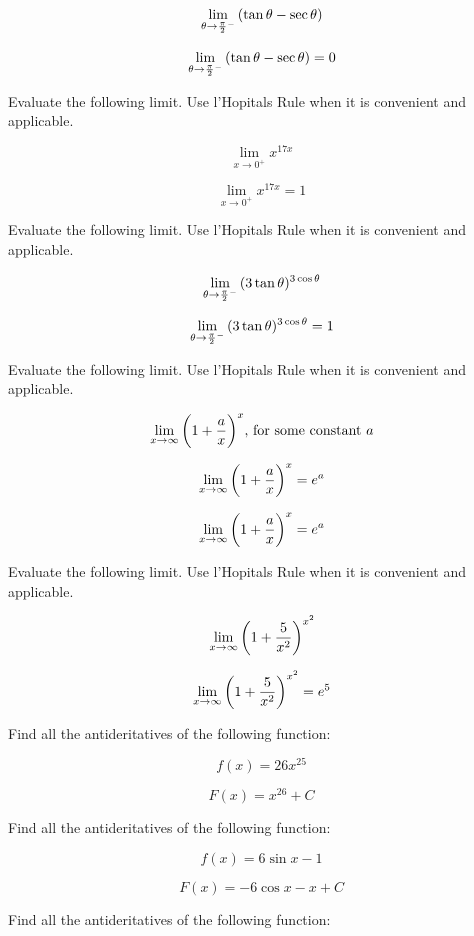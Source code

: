 $$\
\lim_{\theta \to {\pi \over 2}^-}
{
(\tan\theta - \sec\theta)
}
$$

$$\
\lim_{\theta \to {\pi \over 2}^-}
{
(\tan\theta - \sec\theta) = 0
}
$$

Evaluate the following limit. Use l'Hopitals Rule when it is convenient
and applicable.

$$\
\lim_{x \to 0^+}
{
x^{17x}
}
$$

$$\
\lim_{x \to 0^+}
{
x^{17x} = 1
}
$$

Evaluate the following limit. Use l'Hopitals Rule when it is convenient
and applicable.

$$\
\lim_{\theta \to {\pi \over 2}^-}
{
(3\tan\theta)^{3\cos\theta}
}
$$

$$\
\lim_{\theta \to {\pi \over 2}^-}
{
(3\tan\theta)^{3\cos\theta}
} = 1
$$

\problem{4.7.80}
Evaluate the following limit. Use l'Hopitals Rule when it is convenient
and applicable.

$$\
\lim_{x \to \infty}
{
\bigg(
1 + {a \over x}
\bigg)^x
}, \, \hbox{for some constant } a
$$

$$\
\lim_{x \to \infty}
{
\bigg(
1 + {a \over x}
\bigg)^x
} = e^{a}
$$

\solution{4.7.80}
$$\
\lim_{x \to \infty}
{
\bigg(
1 + {a \over x}
\bigg)^x
} = e^{a}
$$

Evaluate the following limit. Use l'Hopitals Rule when it is convenient
and applicable.

$$\
\lim_{x \to \infty}
{
\bigg(
1 + {5 \over x^2}
\bigg)^{x^2}
}
$$

$$\
\lim_{x \to \infty}
{
\bigg(
1 + {5 \over x^2}
\bigg)^{x^2}
} = e^5
$$

 \bigskip

 \bigskip

Find all the antideritatives of the following function:

$$\
f(x) = 26x^{25}
$$

$$\
F(x) = x^{26} + C
$$

Find all the antideritatives of the following function:

$$\
f(x) = 6\sin x - 1
$$

$$\
F(x) = -6\cos x -x + C
$$

\problem{4.9.15}
Find all the antideritatives of the following function:

